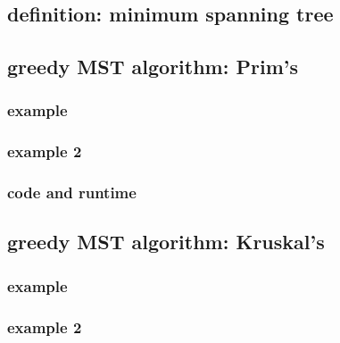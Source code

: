 



\subsection{definition: minimum spanning tree}







%



\subsection{greedy MST algorithm: Prim's}



\subsubsection{example}



\subsubsection{example 2}



\subsubsection{code and runtime}




\subsection{greedy MST algorithm: Kruskal's}



\subsubsection{example}



\subsubsection{example 2}

